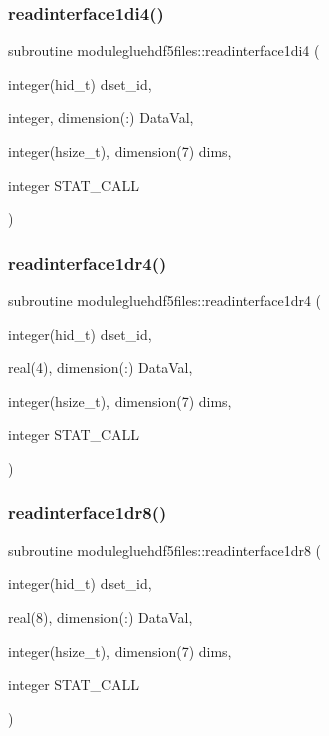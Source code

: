 \subsubsection{\texorpdfstring{readinterface1di4()}{readinterface1di4()}}
{\footnotesize\ttfamily subroutine modulegluehdf5files\+::readinterface1di4 (\begin{DoxyParamCaption}\item[{integer(hid\+\_\+t)}]{dset\+\_\+id,  }\item[{integer, dimension(\+:)}]{Data\+Val,  }\item[{integer(hsize\+\_\+t), dimension(7)}]{dims,  }\item[{integer}]{S\+T\+A\+T\+\_\+\+C\+A\+LL }\end{DoxyParamCaption})\hspace{0.3cm}{\ttfamily [private]}}

\mbox{\label{namespacemodulegluehdf5files_aa4ca3b87506cf4d1f6d0a509d189116b}} 
\subsubsection{\texorpdfstring{readinterface1dr4()}{readinterface1dr4()}}
{\footnotesize\ttfamily subroutine modulegluehdf5files\+::readinterface1dr4 (\begin{DoxyParamCaption}\item[{integer(hid\+\_\+t)}]{dset\+\_\+id,  }\item[{real(4), dimension(\+:)}]{Data\+Val,  }\item[{integer(hsize\+\_\+t), dimension(7)}]{dims,  }\item[{integer}]{S\+T\+A\+T\+\_\+\+C\+A\+LL }\end{DoxyParamCaption})\hspace{0.3cm}{\ttfamily [private]}}

\mbox{\label{namespacemodulegluehdf5files_a1b5be0395974808f570b4d4721230b84}} 
\subsubsection{\texorpdfstring{readinterface1dr8()}{readinterface1dr8()}}
{\footnotesize\ttfamily subroutine modulegluehdf5files\+::readinterface1dr8 (\begin{DoxyParamCaption}\item[{integer(hid\+\_\+t)}]{dset\+\_\+id,  }\item[{real(8), dimension(\+:)}]{Data\+Val,  }\item[{integer(hsize\+\_\+t), dimension(7)}]{dims,  }\item[{integer}]{S\+T\+A\+T\+\_\+\+C\+A\+LL }\end{DoxyParamCaption})\hspace{0.3cm}{\ttfamily [private]}}

